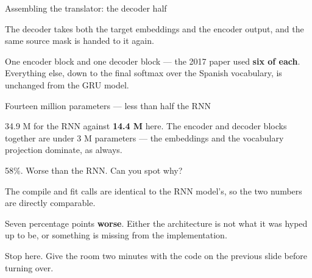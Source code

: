 \documentclass[aspectratio=169,11pt,t]{beamer}
\begin{document}
\begin{frame}[shrink=25]{Assembling the translator: the decoder half}
{\fontsize{9.4}{12.6}\selectfont\color{fg2}The decoder takes both the target embeddings and the encoder output, and the same source mask is handed to it again.\par}\vskip 4pt
{\fontsize{9.4}{12.6}\selectfont\color{fg2}One encoder block and one decoder block --- the 2017 paper used \textbf{six of each}. Everything else, down to the final softmax over the Spanish vocabulary, is unchanged from the GRU model.\par}\vskip 4pt
\end{frame}

\begin{frame}[shrink=25]{Fourteen million parameters --- less than half the RNN}
{\fontsize{9.4}{12.6}\selectfont\color{fg2}34.9 M for the RNN against \textbf{14.4 M} here. The encoder and decoder blocks together are under 3 M parameters --- the embeddings and the vocabulary projection dominate, as always.\par}\vskip 4pt
\end{frame}

\begin{frame}[shrink=25]{58\%. Worse than the RNN. Can you spot why?}
{\fontsize{9.4}{12.6}\selectfont\color{fg2}The compile and fit calls are identical to the RNN model's, so the two numbers are directly comparable.\par}\vskip 4pt
\begin{minipage}[t]{0.494\textwidth}
\end{minipage}%
\hfill
\begin{minipage}[t]{0.494\textwidth}
\end{minipage}%
{\fontsize{9.4}{12.6}\selectfont\color{fg2}Seven percentage points \textbf{worse}. Either the architecture is not what it was hyped up to be, or something is missing from the implementation.\par}\vskip 4pt
\begin{iband}[amber]
Stop here. Give the room two minutes with the code on the previous slide before turning over.
\end{iband}
\end{frame}
\end{document}
